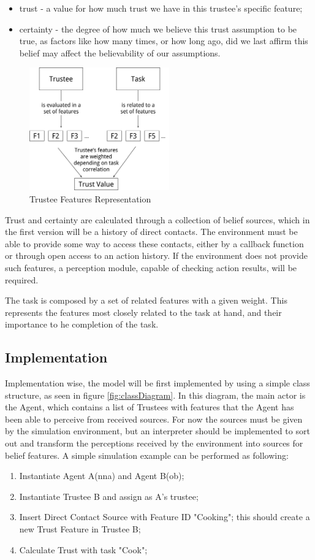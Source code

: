 \begin{itemize}
	\item trust - a value for how much trust we have in this trustee's specific feature;
	\item certainty - the degree of how much we believe this trust assumption to be true, as factors like how many times, or how long ago, did we last affirm this belief may affect the believability of our assumptions.
\end{itemize}
\begin{figure}[hbt]
	\centering
	\includegraphics[height=200px]{figures/Trust_Model_Diagram.png}
	\caption{Trustee Features Representation}
	\label{fig:trustee}
\end{figure}

Trust and certainty are calculated through a collection of belief sources, which in the first version will be a history of direct contacts. The environment must be able to provide some way to access these contacts, either by a callback function or through open access to an action history. If the environment does not provide such features, a perception module, capable of checking action results, will be required.

The task is composed by a set of related features with a given weight. This represents the features most closely related to the task at hand, and their importance to he completion of the task.

\subsection{Implementation}

Implementation wise, the model will be first implemented by using a simple class structure, as seen in figure \ref{fig:classDiagram}. In this diagram, the main actor is the Agent, which contains a list of Trustees with features that the Agent has been able to perceive from received sources. For now the sources must be given by the simulation environment, but an interpreter should be implemented to sort out and transform the perceptions received by the environment into sources for belief features.
A simple simulation example can be performed as following:
\begin{enumerate}
	\item Instantiate Agent A(nna) and Agent B(ob);
	\item Instantiate Trustee B and assign as A's trustee;
	\item Insert Direct Contact Source with Feature ID "Cooking"; this should create a new Trust Feature in Trustee B;
	\item Calculate Trust with task "Cook";
\end{enumerate}

